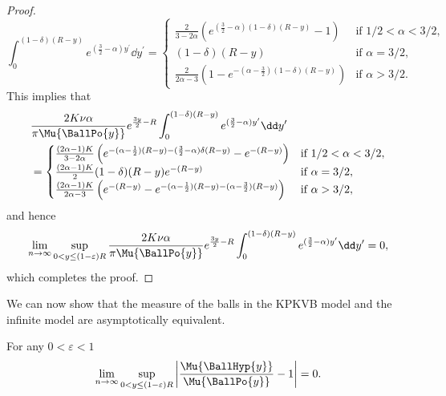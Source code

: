 \begin{proof}
\[
	\int_0^{(1-\delta)(R-y)} e^{(\frac{3}{2} - \alpha)y^\prime} \dd y^\prime
	= \begin{cases}
		\frac{2}{3 - 2\alpha}\left(e^{(\frac{3}{2} - \alpha)(1-\delta)(R-y)} - 1\right) &\mbox{if } 1/2 < \alpha < 3/2,\\
		(1-\delta)(R-y) &\mbox{if } \alpha = 3/2,\\
		\frac{2}{2\alpha-3}\left(1 - e^{-(\alpha - \frac{3}{2})(1-\delta)(R-y)}\right) &\mbox{if } \alpha > 3/2.
	\end{cases}
\]
This implies that
\begin{align*}
	&\frac{2 K \nu \alpha}{\pi \Mu{\BallPo{y}}} e^{\frac{3 y}{2} - R}
		\int_0^{(1-\delta)(R-y)} e^{(\frac{3}{2} - \alpha)y^\prime} \dd y^\prime\\
	&= \begin{cases}
		\frac{(2\alpha - 1)K}{3 - 2\alpha}\left(e^{-(\alpha - \frac{1}{2})(R - y)-(\frac{3}{2}-\alpha)\delta(R-y)} 
			- e^{-(R - y)}\right)
		&\mbox{if } 1/2 < \alpha < 3/2,\\
		\frac{(2\alpha -1)K}{2} (1-\delta)(R - y)e^{-(R - y)} &\mbox{if } \alpha = 3/2,\\
		\frac{(2\alpha - 1)K}{2\alpha - 3} \left(e^{-(R - y)} - e^{-(\alpha - \frac{1}{2})(R - y) 
			-(\alpha - \frac{3}{2})(R-y)}\right)
		&\mbox{if } \alpha > 3/2,
	\end{cases}
\end{align*}
and hence
\[
	\lim_{n \to \infty} \sup_{0 < y \le (1-\varepsilon)R}
	\frac{2 K \nu \alpha}{\pi \Mu{\BallPo{y}}} e^{\frac{3 y}{2} - R}
			\int_0^{(1-\delta)(R-y)} e^{(\frac{3}{2} - \alpha)y^\prime} \dd y^\prime = 0,
\]
which completes the proof.
\end{proof}

We can now show that the measure of the balls in the KPKVB model and the infinite model are asymptotically equivalent.

\begin{lemma}\label{lem:average_degree_hyperbolic}
For any $0 < \varepsilon < 1$
\[
	\lim_{n \to \infty} \sup_{0 < y \le (1-\varepsilon)R} \left|\frac{\Mu{\BallHyp{y}}}{\Mu{\BallPo{y}}} - 1\right| = 0.
\]
\end{lemma}

